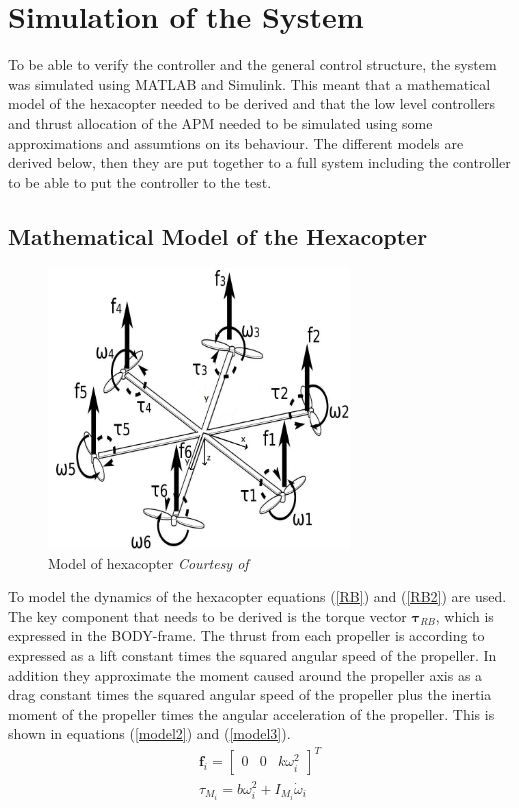 \chapter{Simulation of the System}
To be able to verify the controller and the general control structure, the system was simulated using MATLAB and Simulink. This meant that a mathematical model of the hexacopter needed to be derived and that the low level controllers and thrust allocation of the APM needed to be simulated using some approximations and assumtions on its behaviour. The different models are derived below, then they are put together to a full system including the controller to be able to put the controller to the test.
\section{Mathematical Model of the Hexacopter}
\begin{figure}[H]
\centering
\includegraphics[width = 8cm]{fig/model.jpg}
\caption{Model of hexacopter \textit{Courtesy of \citep{model}}}
\label{model}
\end{figure}
To model the dynamics of the hexacopter equations (\ref{RB}) and (\ref{RB2}) are used. The key component that needs to be derived is the torque vector $\boldsymbol{\tau}_{RB}$, which is expressed in the BODY-frame. The thrust from each propeller is according to \citep{model} expressed as a lift constant times the squared angular speed of the propeller. In addition they approximate the moment caused around the propeller axis as a drag constant times the squared angular speed of the propeller plus the inertia moment of the propeller times the angular acceleration of the propeller. This is shown in equations (\ref{model2}) and (\ref{model3}).
\begin{eqnarray}
\boldsymbol{f}_i = \begin{bmatrix}
0 & 0 & k\omega_i^2
\label{model2}
\end{bmatrix}^T\\
\tau_{M_i} = b\omega_i^2 + I_{M_i}\dot{\omega}_i
\label{model3}
\end{eqnarray} 
